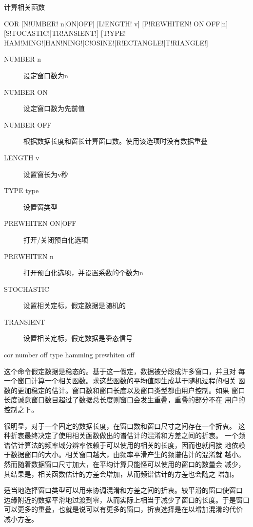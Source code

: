 \label{spe:cor}

计算相关函数

\begin{SACSTX}
COR [N!UMBER! n|ON|OFF] [L!ENGTH! v] [P!REWHITEN! ON|OFF|n]
    [S!TOCASTIC!|TR!ANSIENT!]
    [T!YPE! HAM!MING!|HAN!NING!|C!OSINE!|R!ECTANGLE!|T!RIANGLE!]
\end{SACSTX}

\begin{description}
\item [NUMBER n] 设定窗口数为n
\item [NUMBER ON] 设定窗口数为先前值
\item [NUMBER OFF] 根据数据长度和窗长计算窗口数。使用该选项时没有数据重叠
\item [LENGTH v] 设置窗长为v秒
\item [TYPE type] 设置窗类型
\item [PREWHITEN ON|OFF] 打开/关闭预白化选项
\item [PREWHITEN n] 打开预白化选项，并设置系数的个数为n
\item [STOCHASTIC] 设置相关定标，假定数据是随机的
\item [TRANSIENT] 设置相关定标，假定数据是瞬态信号
\end{description}

\begin{SACDFT}
cor number off type hamming prewhiten off
\end{SACDFT}

这个命令假定数据是稳态的。基于这一假定，数据被分段成许多窗口，并且对
每一个窗口计算一个相关函数。求这些函数的平均值即生成基于随机过程的相关
函数的更加稳定的估计。窗口数和窗口长度以及窗口类型都由用户控制。如果
窗口长度诚意窗口数目超过了数据总长度则窗口会发生重叠，重叠的部分不在
用户的控制之下。

很明显，对于一个固定的数据长度，在窗口数和窗口尺寸之间存在一个折衷。
这种折衷最终决定了使用相关函数做出的谱估计的混淆和方差之间的折衷。
一个频谱估计算法的频率域分辨率依赖于可以使用的相关的长度，因而也就间接
地依赖于数据窗口的大小。相关窗口越大，由频率平滑产生的频谱估计的混淆就
越小。然而随着数据窗口尺寸加大，在平均计算只能怪可以使用的窗口的数量会
减少，其结果是，相关函数估计的方差会增加，从而频谱估计的方差也会随之
增加。

适当地选择窗口类型可以用来协调混淆和方差之间的折衷。较平滑的窗口使窗口
边缘附近的数据平滑地过渡到零，从而实际上相当于减少了窗口的长度。于是窗口
可以更多的重叠，也就是说可以有更多的窗口，折衷选择是在以增加混淆的代价
减小方差。

